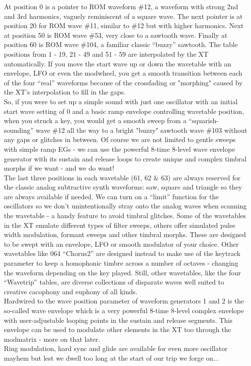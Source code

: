 At position 0 is a pointer to ROM waveform \#12, a waveform with strong 2nd and 3rd harmonics, vaguely reminiscent of a square wave. The next pointer is at position 20 for ROM wave \#11, similar to \#12 but with higher harmonics. Next at position 50 is ROM wave \#53, very close to a sawtooth wave. Finally at position 60 is ROM wave \#104, a familiar classic ``buzzy'' sawtooth. The table positions from 1 - 19, 21 - 49 and 51 - 59 are interpolated by the XT automatically. If you move the start wave up or down the wavetable with an envelope, LFO or even the modwheel, you get a smooth transition between each of the four ``real'' waveforms because of the crossfading or "morphing" caused by the XT's interpolation to fill in the gaps.\\
So, if you were to set up a simple sound with just one oscillator with an initial start wave setting of 0 and a basic ramp envelope controlling wavetable position, when you struck a key, you would get a smooth sweep from a ``squarish-sounding'' wave \#12 all the way to a bright "buzzy" sawtooth wave \#103 without any gaps or glitches in between. Of course we are not limited to gentle sweeps with simple ramp EGs - we can use the powerful 8-time 8-level wave envelope generator with its sustain and release loops to create unique and complex timbral morphs if we want - and we do want!\\
The last three positions in each wavetable (61, 62 \& 63) are always reserved for the classic analog subtractive synth waveforms: saw, square and triangle so they are always available if needed. We can turn on a ``limit'' function for the oscillators so we don't unintentionally stray onto the analog waves when scanning the wavetable - a handy feature to avoid timbral glitches. Some of the wavetables in the XT emulate different types of filter sweeps, others offer simulated pulse width modulation, formant sweeps and other timbral morphs. These are designed to be swept with an envelope, LFO or smooth modulator of your choice. Other wavetables like 064 ``Chorus2'' are designed instead to make use of the keytrack parameter to keep a homophonic timbre across a number of octaves - changing the waveform depending on the key played. Still, other wavetables, like the four ``Wavetrip'' tables, are diverse collections of disparate waves well suited to creative cacophony and euphony of all kinds.\\
Hardwired to the wave position parameter of waveform generators 1 and 2 is the so-called wave envelope which is a very powerful 8-time 8-level complex envelope with user-adjustable looping points in the sustain and release segments. This envelope can be used to modulate other elements in the XT too through the modmatrix - more on that later.\\
Ring modulation, hard sync and glide are available for even more oscillator mayhem but lest we dwell too long at the start of our trip we forge on...
